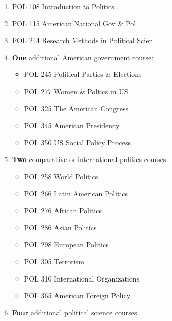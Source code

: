 \documentclass[
  letterpaper,
]{scrbook}
\providecommand{\tightlist}{%
  \setlength{\itemsep}{0pt}\setlength{\parskip}{0pt}}
\begin{document}
\begin{enumerate}
\def\labelenumi{\arabic{enumi}.}
\tightlist
\item
  POL 108 Introduction to Politics\\
\item
  POL 115 American National Gov \& Pol\\
\item
  POL 244 Research Methods in Political Scien\\
\item
  \textbf{One} additional American government course:

  \begin{itemize}
  \tightlist
  \item
    POL 245 Political Parties \& Elections\\
  \item
    POL 277 Women \& Poltics in US\\
  \item
    POL 325 The American Congress\\
  \item
    POL 345 American Presidency\\
  \item
    POL 350 US Social Policy Process\\
  \end{itemize}
\item
  \textbf{Two} comparative or international politics courses:

  \begin{itemize}
  \tightlist
  \item
    POL 258 World Politics\\
  \item
    POL 266 Latin American Politics\\
  \item
    POL 276 African Politics\\
  \item
    POL 286 Asian Politics\\
  \item
    POL 298 European Politics\\
  \item
    POL 305 Terrorism\\
  \item
    POL 310 International Organizations\\
  \item
    POL 365 American Foreign Policy\\
  \end{itemize}
\item
  \textbf{Four} additional political science courses
\end{enumerate}
\end{document}
